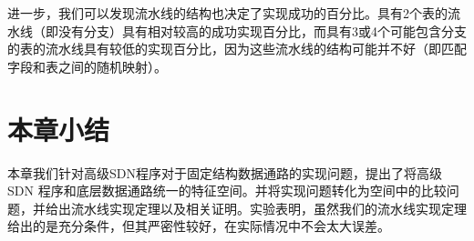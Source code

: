 进一步，我们可以发现流水线的结构也决定了实现成功的百分比。具有2个表的流水线（即没有分支）具有相对较高的成功实现百分比，而具有3或4个可能包含分支的表的流水线具有较低的实现百分比，因为这些流水线的结构可能并不好（即匹配字段和表之间的随机映射）。



\section{本章小结}

本章我们针对高级SDN程序对于固定结构数据通路的实现问题，提出了将高级 SDN 程序和底层数据通路统一的特征空间。并将实现问题转化为空间中的比较问题，并给出流水线实现定理以及相关证明。实验表明，虽然我们的流水线实现定理给出的是充分条件，但其严密性较好，在实际情况中不会太大误差。


